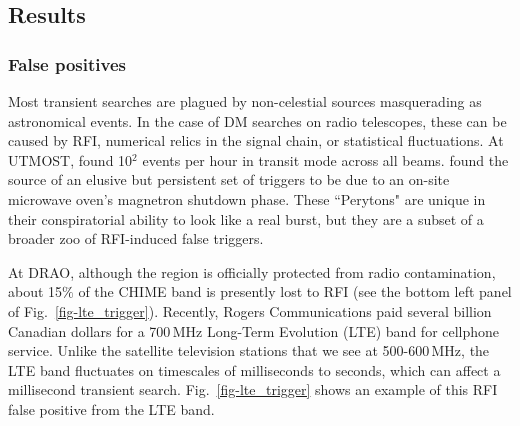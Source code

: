 \subsection{Results}

\subsubsection{False positives}

Most transient searches are plagued by non-celestial sources masquerading 
as astronomical events. 
In the case of DM searches on 
radio telescopes, these can be caused by RFI, numerical relics 
in the signal chain, or statistical fluctuations. 
At UTMOST, \citet{2016MNRAS.458..718C} found 
10$^2$ events per hour in transit mode across all beams. \citet{2015MNRAS.451.3933P}
found the source of an elusive but persistent set of triggers 
to be due to an on-site microwave oven's magnetron shutdown phase. These 
``Perytons" are unique in their conspiratorial ability to 
look like a real burst, but they are a subset of a broader zoo 
of RFI-induced false triggers. 

At DRAO, although the region is officially 
protected from radio contamination, about 15$\%$ of the CHIME
band is presently lost to RFI (see the bottom left 
panel of Fig.~\ref{fig-lte_trigger}). Recently, Rogers Communications 
paid several billion Canadian dollars for a 700\,MHz 
Long-Term Evolution (LTE) band for cellphone service.
Unlike the satellite television stations that we see at 500-600\,MHz, 
the LTE band fluctuates on timescales of milliseconds to seconds, 
which can affect a millisecond transient search. 
Fig.~\ref{fig-lte_trigger} shows an example of this RFI false 
positive from the LTE band. 


